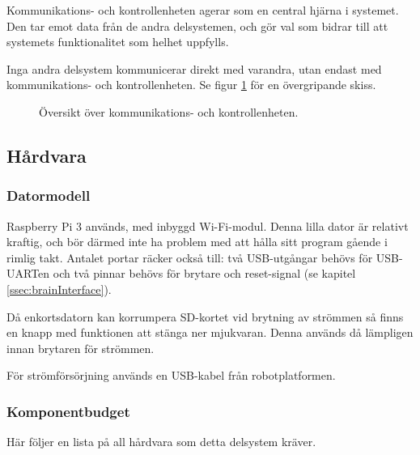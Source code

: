 \documentclass[a4paper,11pt]{article}
\begin{document}
Kommunikations- och kontrollenheten agerar som en central hjärna i systemet. Den tar emot data från de andra delsystemen, och gör val som bidrar till att systemets funktionalitet som helhet uppfylls.

Inga andra delsystem kommunicerar direkt med varandra, utan endast med kommunikations- och kontrollenheten. Se figur \ref{fig:unitBrain} för en övergripande skiss.

\begin{figure}[h!]
    \caption{Översikt över kommunikations- och kontrollenheten.  }
    \label{fig:unitBrain}
\end{figure}

\subsection{Hårdvara}

\subsubsection{Datormodell}
Raspberry Pi 3 används, med inbyggd Wi-Fi-modul. Denna lilla dator är relativt kraftig, och bör därmed inte ha problem med att hålla sitt program gående i rimlig takt. Antalet portar räcker också till: två USB-utgångar behövs för USB-UARTen och två pinnar behövs för brytare och reset-signal (se kapitel \ref{ssec:brainInterface}).

Då enkortsdatorn kan korrumpera SD-kortet vid brytning av strömmen så finns en knapp med funktionen att stänga ner mjukvaran. Denna används då lämpligen innan brytaren för strömmen.

För strömförsörjning används en USB-kabel från robotplatformen.

\subsubsection{Komponentbudget}
Här följer en lista på all hårdvara som detta delsystem kräver.
\end{document}
